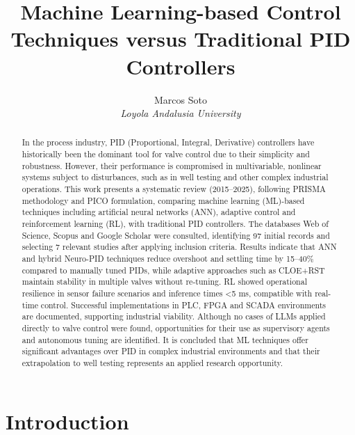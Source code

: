 \documentclass{article}
\title{Machine Learning-based Control Techniques versus Traditional PID Controllers}
\author{Marcos Soto \\ \textit{Loyola Andalusia University}}
\date{}
\begin{document}
\maketitle

\begin{abstract}
  In the process industry, PID (Proportional, Integral, Derivative) controllers have historically been the dominant tool for valve control 
  due to their simplicity and robustness. However, their performance is compromised in multivariable, nonlinear systems subject to disturbances, such as in well testing 
  \parencite{song_dynamic_2023} and other complex industrial operations. This work presents a systematic review (2015–2025), following PRISMA methodology and PICO formulation, comparing 
  machine learning (ML)-based techniques including artificial neural networks (ANN), adaptive control and reinforcement learning (RL), with traditional PID controllers. 
  The databases Web of Science, Scopus and Google Scholar were consulted, identifying 97 initial records and selecting 7 relevant studies after applying 
  inclusion criteria. Results indicate that ANN and hybrid Neuro-PID techniques reduce overshoot and settling time by 15–40\% compared to manually tuned PIDs, 
  while adaptive approaches such as CLOE+RST maintain stability in multiple valves without re-tuning. RL showed operational resilience in 
  sensor failure scenarios and inference times <5 ms, compatible with real-time control. Successful implementations in PLC, FPGA and SCADA environments are documented, supporting 
  industrial viability. Although no cases of LLMs applied directly to valve control were found, opportunities for their use as supervisory agents 
  and autonomous tuning are identified. It is concluded that ML techniques offer significant advantages over PID in complex industrial environments and that their extrapolation to well testing 
  represents an applied research opportunity.
\end{abstract}

\section{Introduction}
\end{document}
